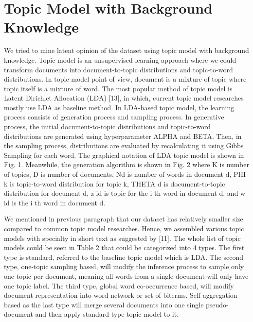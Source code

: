 \documentclass[senior]{IPSstyle}
\begin{document}
\section{Topic Model with Background Knowledge}

We tried to mine latent opinion of the dataset using topic model with background knowledge. Topic model is an unsupervised learning approach where we could transform documents into document-to-topic distributions and topic-to-word distributions. In topic model point of view, document is a mixture of topic where topic itself is a mixture of word. The most popular method of topic model is Latent Dirichlet Allocation (LDA) [13], in which, current topic model researches mostly use LDA as baseline method. In LDA-based topic model, the learning process consists of generation process and sampling process. In generative process, the initial document-to-topic distributions and topic-to-word distributions are generated using hyperparameter ALPHA and BETA. Then, in the sampling process, distributions are evaluated by recalculating it using Gibbs Sampling for each word. The graphical notation of LDA topic model is shown in Fig. 1. Meanwhile, the generation algorithm is shown in Fig. 2 where K is number of topics, D is number of documents, Nd is number of words in document d, PHI k is topic-to-word distribution for topic k, THETA d is document-to-topic distribution for document d, z id is topic for the i th word in document d, and w id is the i th word in document d.

We mentioned in previous paragraph that our dataset has relatively smaller size compared to common topic model researches. Hence, we assembled various topic models with specialty in short text as suggested by [11]. The whole list of topic models could be seen in Table 2 that could be categorized into 4 types. The first type is standard, referred to the baseline topic model which is LDA. The second type, one-topic sampling based, will modify the inference process to sample only one topic per document, meaning all words from a single document will only have one topic label. The third type, global word co-occurrence based, will modify document representation into word-network or set of biterms. Self-aggregation based as the last type will merge several documents into one single pseudo-document and then apply standard-type topic model to it.
\end{document}
